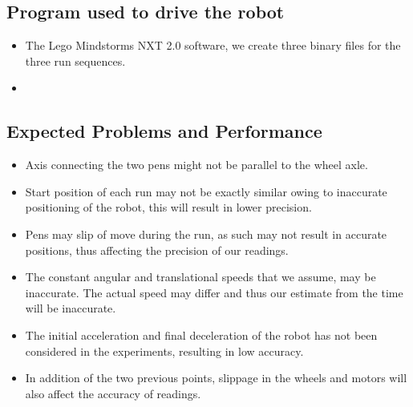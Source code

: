 \documentclass[10pt,a4paper]{article}
\begin{document}
	\subsection{Program used to drive the robot}
		\begin{itemize}
			\item The Lego Mindstorms NXT 2.0 software, we create three binary files for the three run sequences.
			\item 
		\end{itemize}
	\subsection{Expected Problems and Performance}
		\begin{itemize}
			\item Axis connecting the two pens might not be parallel to the wheel axle.
			\item Start position of each run may not be exactly similar owing to inaccurate positioning of the robot, this will result in lower precision.
			\item Pens may slip of move during the run, as such may not result in accurate positions, thus affecting the precision of our readings.
			\item The constant angular and translational speeds that we assume, may be inaccurate. The actual speed may differ and thus our estimate from the time will be inaccurate.
			\item The initial acceleration and final deceleration of the robot has not been considered in the experiments, resulting in low accuracy.
			\item In addition of the two previous points, slippage in the wheels and motors will also affect the accuracy of readings.
		\end{itemize}

	
\end{document}
